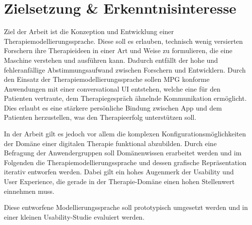 
\section{Zielsetzung \& Erkenntnisinteresse}
\label{ch:Zielsetzung}


Ziel der Arbeit ist die Konzeption und Entwicklung einer Therapiemodellierungssprache. Diese soll es erlauben, technisch wenig versierten Forschern ihre Therapieideen in einer Art und Weise zu formulieren, die eine Maschine verstehen und ausführen kann. Dadurch entfällt der hohe und fehleranfällige Abstimmungsaufwand zwischen Forschern und Entwicklern. Durch den Einsatz der Therapiemodellierungssprache sollen MPG konforme Anwendungen mit einer conversational UI entstehen, welche eine für den Patienten vertraute, dem Therapiegespräch ähnelnde Kommunikation ermöglicht. Dies erlaubt es eine stärkere persönliche Bindung zwischen App und dem Patienten herzustellen, was den Therapieerfolg unterstützen soll. 

In der Arbeit gilt es jedoch vor allem die komplexen Konfigurationsmöglichkeiten der Domäne einer digitalen Therapie funktional abzubilden. Durch eine Befragung der Anwendergruppen soll Domänenwissen erarbeitet werden und im Folgenden die Therapiemodellierungssprache und dessen grafische Repräsentation iterativ entworfen werden. Dabei gilt ein hohes Augenmerk der Usability und User Experience, die gerade in der Therapie-Domäne einen hohen Stellenwert einnehmen muss.

Diese entworfene Modellierungssprache soll prototypisch umgesetzt werden und in einer kleinen Usability-Studie evaluiert werden.
